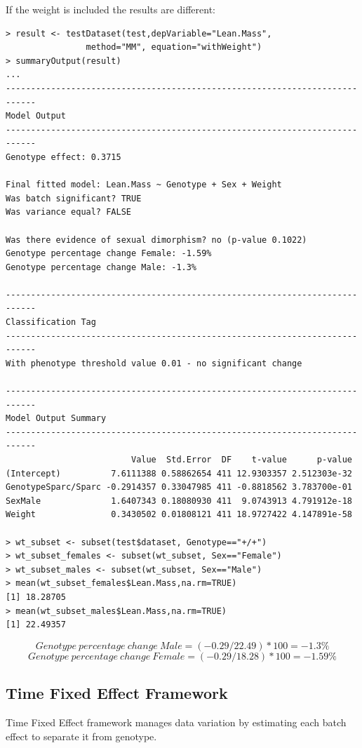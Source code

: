 \documentclass[12pt,a4paper]{article}
\begin{document}
If the weight is included the results are different:
\begingroup
\fontsize{8pt}{12pt}\selectfont
\begin{verbatim}
> result <- testDataset(test,depVariable="Lean.Mass", 
				method="MM", equation="withWeight")
> summaryOutput(result)
...
----------------------------------------------------------------------------
Model Output
----------------------------------------------------------------------------
Genotype effect: 0.3715

Final fitted model: Lean.Mass ~ Genotype + Sex + Weight
Was batch significant? TRUE
Was variance equal? FALSE

Was there evidence of sexual dimorphism? no (p-value 0.1022)
Genotype percentage change Female: -1.59%
Genotype percentage change Male: -1.3%

----------------------------------------------------------------------------
Classification Tag
----------------------------------------------------------------------------
With phenotype threshold value 0.01 - no significant change

----------------------------------------------------------------------------
Model Output Summary
----------------------------------------------------------------------------
                         Value  Std.Error  DF    t-value      p-value
(Intercept)          7.6111388 0.58862654 411 12.9303357 2.512303e-32
GenotypeSparc/Sparc -0.2914357 0.33047985 411 -0.8818562 3.783700e-01
SexMale              1.6407343 0.18080930 411  9.0743913 4.791912e-18
Weight               0.3430502 0.01808121 411 18.9727422 4.147891e-58

> wt_subset <- subset(test$dataset, Genotype=="+/+")
> wt_subset_females <- subset(wt_subset, Sex=="Female")
> wt_subset_males <- subset(wt_subset, Sex=="Male")
> mean(wt_subset_females$Lean.Mass,na.rm=TRUE)
[1] 18.28705
> mean(wt_subset_males$Lean.Mass,na.rm=TRUE)
[1] 22.49357
\end{verbatim}
\endgroup 
\[
Genotype\:percentage\:change\:Male = (-0.29/22.49)*100 = -1.3\%
\]
\[
Genotype\:percentage\:change\:Female = (-0.29/18.28)*100 = -1.59\%
\]

\subsection{Time Fixed Effect Framework}
Time Fixed Effect framework manages data variation by estimating each batch effect to separate it from genotype.
\end{document}
